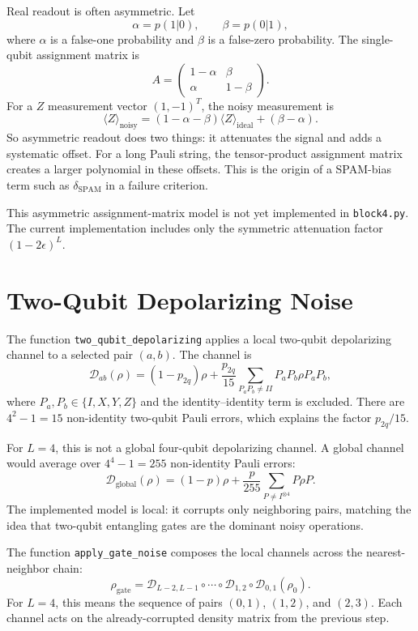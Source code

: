 \documentclass[11pt]{article}
\begin{document}
Real readout is often asymmetric. Let
\[
  \alpha=p(1|0),\qquad \beta=p(0|1),
\]
where $\alpha$ is a false-one probability and $\beta$ is a false-zero probability. The single-qubit assignment matrix is
\[
A=\begin{pmatrix}
1-\alpha & \beta\\
\alpha & 1-\beta
\end{pmatrix}.
\]
For a $Z$ measurement vector $(1,-1)^T$, the noisy measurement is
\[
  \langle Z\rangle_{\mathrm{noisy}}
  =(1-\alpha-\beta)\langle Z\rangle_{\mathrm{ideal}}+(\beta-\alpha).
\]
So asymmetric readout does two things: it attenuates the signal and adds a systematic offset. For a long Pauli string, the tensor-product assignment matrix creates a larger polynomial in these offsets. This is the origin of a SPAM-bias term such as $\delta_{\mathrm{SPAM}}$ in a failure criterion.

This asymmetric assignment-matrix model is not yet implemented in \texttt{block4.py}. The current implementation includes only the symmetric attenuation factor $(1-2\epsilon)^L$.

\section{Two-Qubit Depolarizing Noise}

The function \texttt{two\_qubit\_depolarizing} applies a local two-qubit depolarizing channel to a selected pair $(a,b)$. The channel is
\[
  \mathcal{D}_{ab}(\rho)
  = (1-p_{2q})\rho
  + \frac{p_{2q}}{15}\sum_{P_aP_b\neq II} P_aP_b\rho P_aP_b,
\]
where $P_a,P_b\in\{I,X,Y,Z\}$ and the identity--identity term is excluded. There are $4^2-1=15$ non-identity two-qubit Pauli errors, which explains the factor $p_{2q}/15$.

For $L=4$, this is not a global four-qubit depolarizing channel. A global channel would average over $4^4-1=255$ non-identity Pauli errors:
\[
  \mathcal{D}_{\mathrm{global}}(\rho)
  =(1-p)\rho+\frac{p}{255}\sum_{P\neq I^{\otimes4}}P\rho P.
\]
The implemented model is local: it corrupts only neighboring pairs, matching the idea that two-qubit entangling gates are the dominant noisy operations.

The function \texttt{apply\_gate\_noise} composes the local channels across the nearest-neighbor chain:
\[
  \rho_{\mathrm{gate}}
  = \mathcal{D}_{L-2,L-1}\circ\cdots\circ\mathcal{D}_{1,2}\circ\mathcal{D}_{0,1}(\rho_0).
\]
For $L=4$, this means the sequence of pairs $(0,1)$, $(1,2)$, and $(2,3)$. Each channel acts on the already-corrupted density matrix from the previous step.
\end{document}
